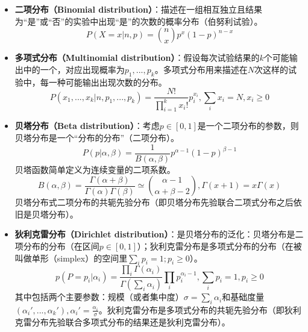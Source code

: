 \documentclass[master]{njuthesis}
\begin{document}
\begin{itemize}
\item \textbf{二项分布（Binomial distribution）}：描述在一组相互独立且结果为“是”或“否”的实验中出现“是”的次数的概率分布（伯努利试验）。
	\begin{equation}
	P(X=x | n, p)=\binom{n}{x}p^{x}(1-p)^{n-x}
	\end{equation}
\item \textbf{多项式分布（Multinomial distribution）}：假设每次试验结果的$k$个可能输出中的一个，对应出现概率为$p_1, ..., p_k$。多项式分布用来描述在$N$次这样的试验中，每一种可能输出出现次数的分布。
	\begin{equation}
	P(x_1, ..., x_k | n, p_1, ..., p_k)=\frac{N!}{\prod_{i=1}^{k}x_i!}p_i^{x_i},\sum_{i}x_i=N,x_i\geq 0
	\end{equation}
\item \textbf{贝塔分布（Beta distribution）}：考虑$p\in [0,1]$是一个二项分布的参数，则贝塔分布是一个“分布的分布”（二项分布）。
	\begin{equation}
	P(p | \alpha, \beta)=\frac{1}{B(\alpha, \beta)}p^{\alpha - 1}(1-p)^{\beta - 1}
	\end{equation}
	贝塔函数简单定义为连续变量的二项系数。
	\begin{equation}
	B(\alpha, \beta)=\frac{\Gamma(\alpha + \beta)}{\Gamma(\alpha)\Gamma(\beta)} \simeq \binom{\alpha - 1}{\alpha + \beta - 2}, \Gamma(x+1) =x\Gamma(x)
	\end{equation}
	贝塔分布式二项分布的共轭先验分布（即贝塔分布先验联合二项式分布之后依旧是贝塔分布）。
\item \textbf{狄利克雷分布（Dirichlet distribution）}：是贝塔分布的泛化：贝塔分布是二项分布的分布（在区间$p\in [0,1]$）；狄利克雷分布是多项式分布的分布（在被叫做单形（simplex）的空间里$\sum_{i}p_i=1; p_i\geq 0$）。
	\begin{equation}
	p(P={p_i} | \alpha_i)=\frac{\prod_{i}\Gamma(\alpha_i)}{\Gamma(\sum_{i}\alpha_i)}\prod_{i}p_i^{\alpha_i - 1}, \sum_{i}p_i = 1, p_i\geq 0
	\end{equation}
	其中包括两个主要参数：规模（或者集中度）$\sigma=\sum_{i}\alpha_i$和基础度量$({\alpha_i}', ..., {\alpha_k}'), {\alpha_i}'=\frac{\alpha_i}{\sigma}$。狄利克雷分布是多项式分布的共轭先验分布（即狄利克雷分布先验联合多项式分布的结果还是狄利克雷分布）。
	

\end{itemize}
\end{document}

